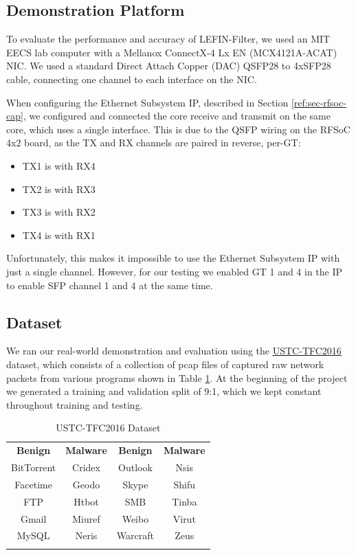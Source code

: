 \documentclass[conference]{IEEEtran}
\begin{document}
\subsection{Demonstration Platform}
To evaluate the performance and accuracy of LEFIN-Filter,
we used an MIT EECS lab computer with a
Mellanox ConnectX-4 Lx EN (MCX4121A-ACAT) NIC.
We used a standard Direct Attach Copper (DAC)
QSFP28 to 4xSFP28 cable, connecting one channel
to each interface on the NIC.

When configuring the Ethernet Subsystem IP,
described in Section \ref{ref:sec-rfsoc-cap},
we configured and connected the core
receive and transmit on the same core,
which uses a single interface.
This is due to the QSFP wiring on the RFSoC 4x2
board, as the TX and RX channels are paired in reverse,
per-GT:
\begin{itemize}
    \item TX1 is with RX4
    \item TX2 is with RX3
    \item TX3 is with RX2
    \item TX4 is with RX1
\end{itemize}
Unfortunately, this makes it impossible to use the
Ethernet Subsystem IP with just a single channel.
However, for our testing we enabled GT 1 and 4
in the IP to enable SFP
channel 1 and 4 at the same time.

\subsection{Dataset}
We ran our real-world demonstration and evaluation using the
\href{https://github.com/davidyslu/USTC-TFC2016}{USTC-TFC2016}
dataset, which consists of a collection of pcap files of captured raw network packets from various programs shown in Table \ref{tab:dataset}. At the beginning of the project we generated a training and validation split of 9:1, which we kept constant throughout training and testing.

\begin{table}[t]
    \centering
    \begin{tabular}{cccc}
        \textbf{Benign} & \textbf{Malware} & \textbf{Benign} & \textbf{Malware} \\
        BitTorrent      & Cridex           & Outlook         & Nsis             \\
        Facetime        & Geodo            & Skype           & Shifu            \\
        FTP             & Htbot            & SMB             & Tinba            \\
        Gmail           & Miuref           & Weibo           & Virut            \\
        MySQL           & Neris            & Warcraft        & Zeus             \\
        \\
    \end{tabular}
    \caption{USTC-TFC2016 Dataset}
    \label{tab:dataset}
\end{table}
\end{document}
